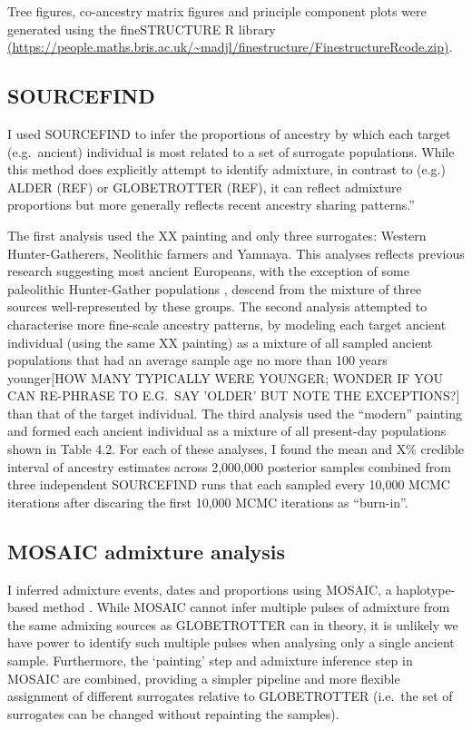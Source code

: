 Tree figures, co-ancestry matrix figures and principle component plots were generated using the fineSTRUCTURE R library \url{(https://people.maths.bris.ac.uk/~madjl/finestructure/FinestructureRcode.zip)}.

\subsection{SOURCEFIND}

I used SOURCEFIND \cite{Chacon-Duque2018} to infer the proportions of ancestry by which each target (e.g.\ ancient) individual is most related to a set of surrogate populations. While this method does explicitly attempt to identify admixture, in contrast to (e.g.) ALDER (REF) or GLOBETROTTER (REF), it can reflect admixture proportions \cite{Chacon-Duque2018} but more generally reflects recent ancestry sharing patterns.''

The first analysis used the XX painting and only three surrogates: Western Hunter-Gatherers, Neolithic farmers and Yamnaya. This analyses reflects previous research suggesting most ancient Europeans, with the exception of some paleolithic Hunter-Gather populations \cite{Fu2016}, descend from the mixture of three sources well-represented by these groups. The second analysis attempted to characterise more fine-scale ancestry patterns, by modeling each target ancient individual (using the same XX painting) as a mixture of all sampled ancient populations that had an average sample age no more than 100 years younger[HOW MANY TYPICALLY WERE YOUNGER; WONDER IF YOU CAN RE-PHRASE TO E.G.\ SAY 'OLDER' BUT NOTE THE EXCEPTIONS?] than that of the target individual. The third analysis used the ``modern'' painting and formed each ancient individual as a mixture of all present-day populations shown in Table 4.2. For each of these analyses, I found the mean and X\% credible interval of ancestry estimates across 2,000,000 posterior samples combined from three independent SOURCEFIND runs that each sampled every 10,000 MCMC iterations after discaring the first 10,000 MCMC iterations as ``burn-in''.


\subsection{MOSAIC admixture analysis}

I inferred admixture events, dates and proportions using MOSAIC, a haplotype-based method \cite{MOSAIC_2019}. While MOSAIC cannot infer multiple pulses of admixture from the same admixing sources as GLOBETROTTER can in theory, it is unlikely we have power to identify such multiple pulses when analysing only a single ancient sample. Furthermore, the `painting' step and admixture inference step in MOSAIC are combined, providing a simpler pipeline and more flexible assignment of different surrogates relative to GLOBETROTTER (i.e.\ the set of surrogates can be changed without repainting the samples).

